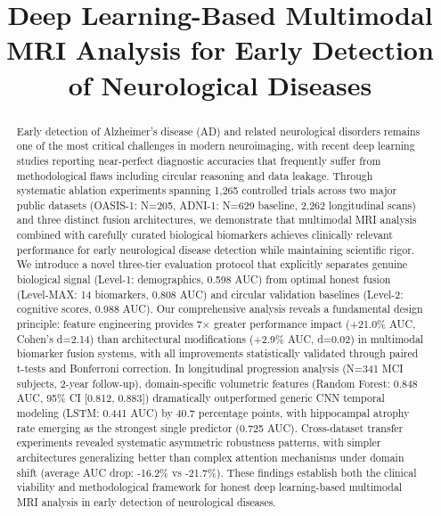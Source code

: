 \documentclass[conference]{IEEEtran}
\begin{document}
\title{Deep Learning-Based Multimodal MRI Analysis for Early Detection of Neurological Diseases}

\author{
}

\maketitle

\begin{abstract}
Early detection of Alzheimer's disease (AD) and related neurological disorders remains one of the most critical challenges in modern neuroimaging, with recent deep learning studies reporting near-perfect diagnostic accuracies that frequently suffer from methodological flaws including circular reasoning and data leakage. Through systematic ablation experiments spanning 1,265 controlled trials across two major public datasets (OASIS-1: N=205, ADNI-1: N=629 baseline, 2,262 longitudinal scans) and three distinct fusion architectures, we demonstrate that multimodal MRI analysis combined with carefully curated biological biomarkers achieves clinically relevant performance for early neurological disease detection while maintaining scientific rigor. We introduce a novel three-tier evaluation protocol that explicitly separates genuine biological signal (Level-1: demographics, 0.598 AUC) from optimal honest fusion (Level-MAX: 14 biomarkers, 0.808 AUC) and circular validation baselines (Level-2: cognitive scores, 0.988 AUC). Our comprehensive analysis reveals a fundamental design principle: feature engineering provides 7× greater performance impact (+21.0\% AUC, Cohen's d=2.14) than architectural modifications (+2.9\% AUC, d=0.02) in multimodal biomarker fusion systems, with all improvements statistically validated through paired t-tests and Bonferroni correction. In longitudinal progression analysis (N=341 MCI subjects, 2-year follow-up), domain-specific volumetric features (Random Forest: 0.848 AUC, 95\% CI [0.812, 0.883]) dramatically outperformed generic CNN temporal modeling (LSTM: 0.441 AUC) by 40.7 percentage points, with hippocampal atrophy rate emerging as the strongest single predictor (0.725 AUC). Cross-dataset transfer experiments revealed systematic asymmetric robustness patterns, with simpler architectures generalizing better than complex attention mechanisms under domain shift (average AUC drop: -16.2\% vs -21.7\%). These findings establish both the clinical viability and methodological framework for honest deep learning-based multimodal MRI analysis in early detection of neurological diseases.
\end{abstract}
\end{document}
